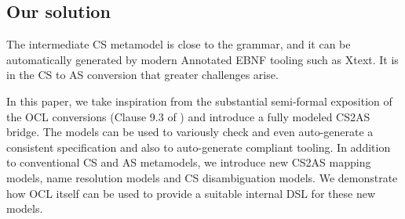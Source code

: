 \documentclass{llncs}
\begin{document}
\subsection{Our solution}

The intermediate CS metamodel is close to the grammar, and it can be automatically generated by modern Annotated EBNF tooling such as Xtext. It is in the CS to AS conversion that greater challenges arise. 

In this paper, we take inspiration from the substantial semi-formal exposition of the OCL conversions (Clause 9.3 of \cite{omg2013ocl}) and introduce a fully modeled CS2AS bridge. The models can be used to variously check and even auto-generate a consistent specification and also to auto-generate compliant tooling. In addition to conventional CS and AS metamodels, we introduce new CS2AS mapping models, name resolution models and CS disambiguation models. We demonstrate how OCL itself can be used to provide a suitable internal DSL for these new models.



\end{document}
